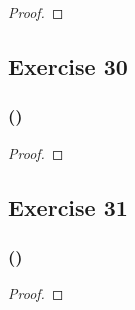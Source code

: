 \documentclass[14pt]{extarticle}
\begin{document}
\begin{proof}

\end{proof}

\subsection{Exercise 30}

\subsubsection{()}

\begin{proof}

\end{proof}

\subsection{Exercise 31}

\subsubsection{()}

\begin{proof}

\end{proof}
\end{document}
